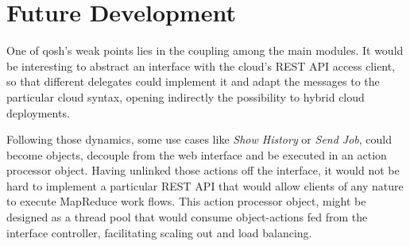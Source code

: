\section*{Future Development}\label{sec:directricesfuturo}
\noindent One of qosh's weak points lies in the coupling among the main modules. It would be interesting to abstract an interface with the cloud's REST API access client, so that different delegates could implement it and adapt the messages to the particular cloud syntax, opening indirectly the possibility to hybrid cloud deployments.

Following those dynamics, some use cases like \emph{Show History} or \emph{Send Job}, could become objects, decouple from the web interface and be executed in an action processor object. Having unlinked those actions off the interface, it would not be hard to implement a particular REST API that would allow clients of any nature to execute MapReduce work flows. This action processor object, might be designed as a thread pool that would consume object-actions fed from the interface controller, facilitating scaling out and load balancing.
